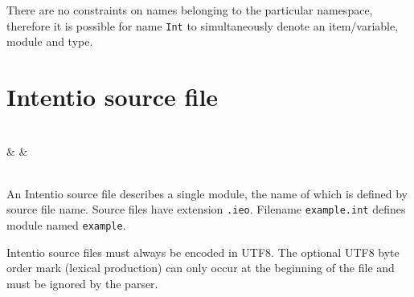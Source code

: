 There are no constraints on names belonging to the particular namespace, therefore it is possible for name \texttt{Int} to simultaneously denote an item/variable, module and type.

\section{Intentio source file}

\begin{bnf}
   \eq {} \\
            & &  \\
  \\
   \eq {} 
\end{bnf}

An Intentio source file describes a single module, the name of which is defined by source file name. Source files have extension \lstinline{.ieo}. Filename \lstinline{example.int} defines module named \lstinline{example}.

\begin{bnfutils}
Intentio source files must always be encoded in UTF8. The optional UTF8 byte order mark (lexical  production) can only occur at the beginning of the file and must be ignored by the parser.
\end{bnfutils}

